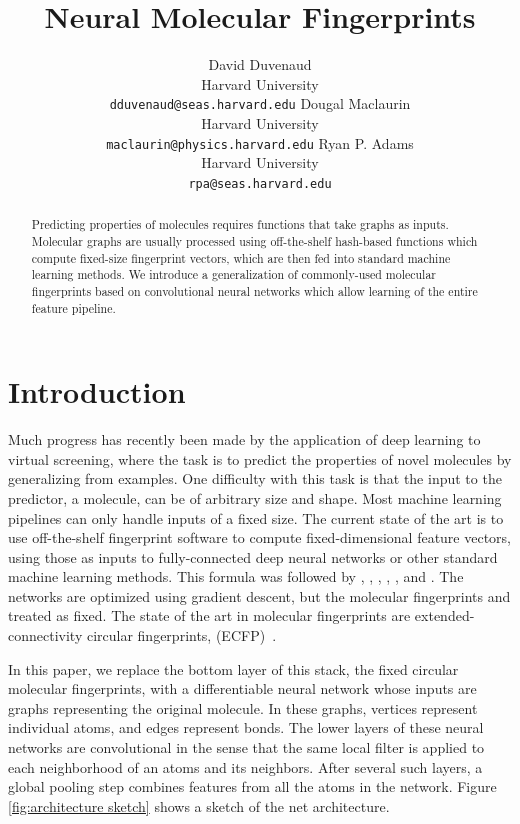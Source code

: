 \documentclass{article}
\title{Neural Molecular Fingerprints}
\author{
David Duvenaud\\
Harvard University\\
\texttt{dduvenaud@seas.harvard.edu}
\And
Dougal Maclaurin\\
Harvard University\\
\texttt{maclaurin@physics.harvard.edu}
\And
Ryan P. Adams\\
Harvard University\\
\texttt{rpa@seas.harvard.edu}
}
\begin{document}
\maketitle

\begin{abstract}
Predicting properties of molecules requires functions that take graphs as inputs.
Molecular graphs are usually processed using off-the-shelf hash-based functions which compute fixed-size fingerprint vectors, which are then fed into standard machine learning methods.
We introduce a generalization of commonly-used molecular fingerprints based on convolutional neural networks which allow learning of the entire feature pipeline.
\end{abstract}

\section{Introduction}

Much progress has recently been made by the application of deep learning to virtual screening, where the task is to predict the properties of novel molecules by generalizing from examples.
One difficulty with this task is that the input to the predictor, a molecule, can be of arbitrary size and shape.
Most machine learning pipelines can only handle inputs of a fixed size.
The current state of the art is to use off-the-shelf fingerprint software to compute fixed-dimensional feature vectors, using those as inputs to fully-connected deep neural networks or other standard machine learning methods.
This formula was followed by \citet{unterthinerdeep}, \citet{dahl2014multi}, \citet{tingley2014towards}, \citet{unterthiner2015toxicity},  \citet{ramsundar2015massively}, and \citet{ma_qsar_2015}.
The networks are optimized using gradient descent, but the molecular fingerprints and treated as fixed.
The state of the art in molecular fingerprints are extended-connectivity circular fingerprints, (ECFP)~\citep{ECFP2010}.%

In this paper, we replace the bottom layer of this stack, the fixed circular molecular fingerprints, with a differentiable neural network whose inputs are graphs representing the original molecule.
In these graphs, vertices represent individual atoms, and edges represent bonds.
The lower layers of these neural networks are convolutional in the sense that the same local filter is applied to each neighborhood of an atoms and its neighbors.
After several such layers, a global pooling step combines features from all the atoms in the network.
Figure \ref{fig:architecture sketch} shows a sketch of the net architecture.
\end{document}
